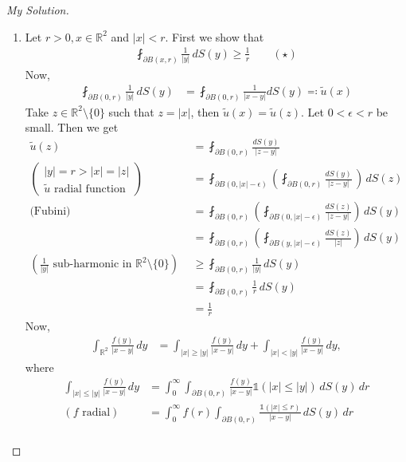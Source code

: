 \documentclass{report}
\theoremstyle{tommy}
\begin{document}
\begin{proof}[My Solution]
\begin{enumerate}[label=\alph*)]
      \item Let \(r > 0, x \in \mathbb{R}^2\) and \(|x| < r\). First we show that
      \begin{align*}
        \fint_{\partial B(x, r)} \frac{1}{|y|} \, dS(y) \ge \frac{1}{r} \qquad (\star)
      \end{align*}
      Now, 
      \begin{align*}
        \fint_{\partial B(0, r)} \frac{1}{|y|} \, dS(y)
        &= \fint_{\partial B(0, r)} \frac{1}{|x-y|} dS(y) \eqqcolon \tilde u(x)
      \end{align*}
      Take \(z \in \mathbb{R}^2 \setminus \{0\}\) such that \(z = |x|\), then \(\tilde u(x) = \tilde u(z)\). Let \(0 < \epsilon < r\) be small. Then we get
      \begin{align*}
        \tilde u(z) 
        &= \fint_{\partial B(0, r)} \frac{dS(y)}{|z-y|} \\
        \left(\begin{aligned}|y| = r > |x| = |z| \\ \tilde u \text{ radial function} \end{aligned}\right)
        \quad &= \fint_{\partial B(0, |x|-\epsilon)} \left(\fint_{\partial B(0, r)} \frac{dS(y)}{|z-y|} \, \right) \, dS(z) \\
        \text{(Fubini)} \quad &= \fint_{\partial B(0, r)} \left(\fint_{\partial B(0, |x|-\epsilon)} \frac{dS(z)}{|z-y|}\right) \, dS(y) \\
        &= \fint_{\partial B(0, r)} \left(\fint_{\partial B(y, |x|-\epsilon)} \frac{dS(z)}{|z|}\right) \, dS(y) \\
        \left(\frac{1}{|y|} \text{ sub-harmonic in } \mathbb{R}^2\setminus \{0\}\right) 
        \quad &\ge \fint_{\partial B(0, r)} \frac{1}{|y|} \, dS(y) \\
        &= \fint_{\partial B(0, r)} \frac{1}{r} \, dS(y) \\
        &= \frac{1}{r}
      \end{align*}
      Now, 
      \begin{align*}
        \int_{\mathbb{R}^2} \frac{f(y)}{|x-y|} \, dy &= \int_{|x| \ge |y|} \frac{f(y)}{|x-y|} \, dy + \int_{|x| < |y|} \frac{f(y)}{|x-y|} \, dy,
      \end{align*}
      where
      \begin{align*}
        \int_{|x| \le |y|} \frac{f(y)}{|x-y|} \, dy &= \int_0^\infty \int_{\partial B(0, r)} \frac{f(y)}{|x-y|} \mathbb{1}(|x| \le |y|) \, dS(y)  \, dr \\
        (f \text{ radial}) \quad &= \int_0^\infty f(r) \int_{\partial B(0,r)} \frac{\mathbb{1}(|x| \le r)}{|x-y|} \, dS(y) \, dr \\

\end{align*}
\end{enumerate}
\end{proof}
\end{document}

